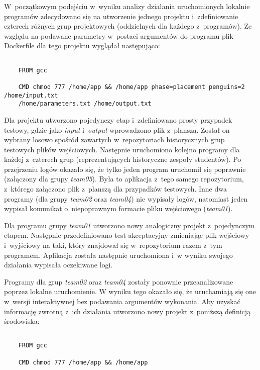 W~początkowym podejściu w~wyniku analizy działania uruchomionych lokalnie programów zdecydowano się na utworzenie jednego projektu i~zdefiniowanie czterech różnych grup projektowych (oddzielnych dla każdego z~programów).
Ze względu na podawane parametry w~postaci argumentów do programu plik Dockerfile dla tego projektu wyglądał następująco:

{\selectfont
\tiny
\begin{lstlisting}

    FROM gcc

    CMD chmod 777 /home/app && /home/app phase=placement penguins=2 /home/input.txt
    /home/parameters.txt /home/output.txt

\end{lstlisting}
}

Dla projektu utworzono pojedynczy etap i~zdefiniowano prosty przypadek testowy, gdzie jako \textit{input} i~\textit{output} wprowadzono plik z~planszą.
Został on wybrany losowo spośród zawartych w~repozytoriach historycznych grup testowych plików wejściowych.
Następnie uruchomiono kolejno programy dla każdej z~czterech grup (reprezentujących historyczne zespoły studentów).
Po przejrzeniu logów okazało się, że tylko jeden program uruchomił się poprawnie (załączony dla grupy \textit{team05}).
Była to aplikacja z~tego samego repozytorium, z~którego załączono plik z~planszą dla przypadków testowych.
Inne dwa programy (dla grupy \textit{team02} oraz \textit{team04}) nie wypisały logów, natomiast jeden wypisał komunikat o~niepoprawnym formacie pliku wejściowego (\textit{team01}).

Dla programu grupy \textit{team01} utworzono nowy analogiczny projekt z~pojedynczym etapem.
Następnie przedefiniowano test akceptacyjny zmieniając plik wejściowy i~wyjściowy na taki, który znajdował się w~repozytorium razem z~tym programem.
Aplikacja została następnie uruchomiona i~w wyniku swojego działania wypisała oczekiwane logi.

Programy dla grup \textit{team02} oraz \textit{team04} zostały ponownie przeanalizowane poprzez lokalne uruchomienie.
W wyniku tego okazało się, że uruchamiają się one w~wersji interaktywnej bez podawania argumentów wykonania.
Aby uzyskać informację zwrotną z~ich działania utworzono nowy projekt z~poniższą definicją środowiska:

{\selectfont
\tiny
\begin{lstlisting}

    FROM gcc

    CMD chmod 777 /home/app && /home/app

\end{lstlisting}
}

